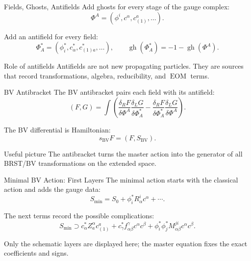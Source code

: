 \documentclass[aspectratio=169,professionalfonts]{beamer}
\newcommand{\slidecite}[1]{{\scriptsize\color{CourseGold}#1}}
\newcommand{\gh}{\ensuremath{\operatorname{gh}}}
\newcommand{\EOM}{\ensuremath{\operatorname{EOM}}}
\newcommand{\BV}{\ensuremath{S_{\mathrm{BV}}}}
\begin{document}
\begin{frame}{Fields, Ghosts, Antifields}
  Add ghosts for every stage of the gauge complex:
  \[
    \Phi^A=(\phi^i,c^\alpha,c^a_{(1)},\ldots).
  \]

  Add an antifield for every field:
  \[
    \Phi_A^*=(\phi_i^*,c_\alpha^*,c^*_{(1)a},\ldots),
    \qquad
    \gh(\Phi_A^*)=-1-\gh(\Phi^A).
  \]

  \begin{exampleblock}{Role of antifields}
    Antifields are not new propagating particles. They are sources that record
    transformations, algebra, reducibility, and \EOM{} terms.
  \end{exampleblock}
\end{frame}

\begin{frame}{BV Antibracket}
  The BV antibracket pairs each field with its antifield:
  \[
    (F,G)
    =\int
    \left(
    \frac{\delta_R F}{\delta\Phi^A}
    \frac{\delta_L G}{\delta\Phi_A^*}
    -
    \frac{\delta_R F}{\delta\Phi_A^*}
    \frac{\delta_L G}{\delta\Phi^A}
    \right).
  \]

  The BV differential is Hamiltonian:
  \[
    s_{\mathrm{BV}}F=(F,\BV).
  \]

  \begin{block}{Useful picture}
    The antibracket turns the master action into the generator of all BRST/BV
    transformations on the extended space.
  \end{block}
\end{frame}

\begin{frame}{Minimal BV Action: First Layers}
  The minimal action starts with the classical action and adds the gauge data:
  \[
    S_{\min}
    =S_0+\phi_i^*R^i_\alpha c^\alpha+\cdots .
  \]

  The next terms record the possible complications:
  \[
    S_{\min}\supset
    c_\alpha^*Z^\alpha_a c^a_{(1)}
    +c_\gamma^*f^\gamma_{\alpha\beta}c^\alpha c^\beta
    +\phi_i^*\phi_j^*M^{ji}_{\alpha\beta}c^\alpha c^\beta .
  \]

  \slidecite{Only the schematic layers are displayed here; the master equation fixes the exact coefficients and signs.}
\end{frame}
\end{document}
